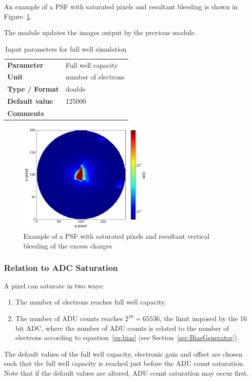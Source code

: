 \documentclass[11pt]{article}      %
\def\HCode#1{}
\def\htmlanchor#1{\HCode{<a id="#1"></a>}}
\begin{document}
An example of a PSF with saturated pixels and resultant bleeding is shown in Figure~\ref{fig:bleeding}.

The module updates the images output by the previous module.

\begin{table}[hb]
  \caption{Input parameters for full well simulation}

  \htmlanchor{fullWellCapacity}
  \begin{tabular}{| l | p{13cm} |}
    \hline 
    {\bf Parameter} & Full well capacity\\
    {\bf Unit} & number of electrons\\
    {\bf Type / Format} & double\\
    {\bf Default value} & 125000\\
    {\bf Comments} & \\
    \hline
  \end{tabular}
  \bigskip

  \label{tab:fullWell}
\end{table}

\begin{figure}[hbtp]
  \begin{center}
    \includegraphics[width=0.6\textwidth]{bleeding.png}
    \caption{Example of a PSF with saturated pixels and resultant vertical bleeding of the excess charges}
    \label{fig:bleeding}
  \end{center}
\end{figure}

\subsubsection{Relation to ADC Saturation}

A pixel can saturate in two ways:
\begin{enumerate}
\item The number of electrons reaches full well capacity.
\item The number of ADU counts reaches $2^{16}=65536$, the limit imposed by the 16 bit ADC, where the number of ADU counts is related to the number of electrons according to equation~\ref{eq:bias} (see Section~\ref{sec:BiasGenerator}).
\end{enumerate}
The default values of the full well capacity, electronic gain and offset are chosen such that the full well capacity is reached just before the ADU count saturation.  Note that if the default values are altered, ADU count saturation may occur first.
\end{document}
